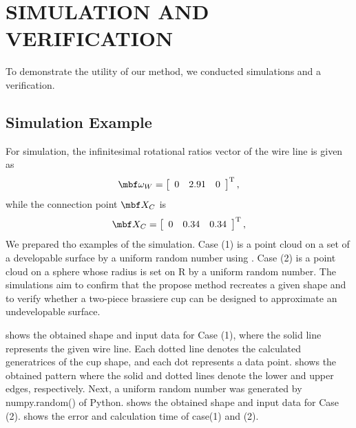 \documentclass[E]{scitrans}
\begin{document}
\section*{SIMULATION AND VERIFICATION}
To demonstrate the utility of our method, we conducted simulations and a verification. 
\subsection*{Simulation Example}
For simulation, the infinitesimal rotational ratios vector   of the wire line is given as
\begin{equation}\label{eq:vrf_omgW}
	\mbold{\omega}_W = \left[ \begin{array}{ccc}
	0 & 2.91 & 0
	\end{array}\right]^\mathrm{T}, 
\end{equation}
while the connection point $ \mbold{X}_C $ is  
\begin{equation}\label{eq:givenXc}
	\mbold{X}_C = \left[ \begin{array}{ccc}
	0 & 0.34 & 0.34
	\end{array}\right]^\mathrm{T},
\end{equation}
We prepared tho examples of the simulation. Case (1) is a point cloud on a set of a developable surface by a uniform random number using . Case (2) is a point cloud on a sphere whose radius is set on R by a uniform random number. The simulations aim to confirm that the propose method recreates a given shape and to verify whether a two-piece brassiere cup can be designed to approximate an undevelopable surface.

 shows the obtained shape and input data for Case (1), where the solid line represents the given wire line. Each dotted line denotes the calculated generatrices of the cup shape, and each dot represents a data point.   shows the obtained pattern where the solid and dotted lines denote the lower and upper edges, respectively.
Next, a uniform random number was generated by numpy.random() of Python.  shows the obtained shape and input data for Case (2).  shows the error and calculation time of case(1) and (2).
\end{document}
